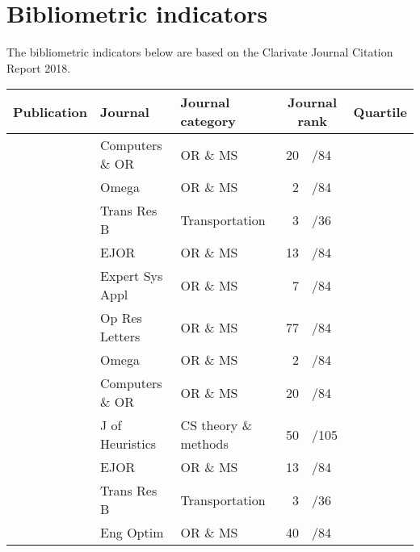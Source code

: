 \section*{Bibliometric indicators}

The bibliometric indicators below are based on the Clarivate Journal Citation Report 2018.

\begin{center}\footnotesize
    \begin{tabular}{p{7cm} p{2.5cm} p{2.5cm} r @{} l c}
        \toprule
        {\bf Publication} & {\bf Journal} & {\bf Journal category} & \multicolumn{2}{c}{\bf Journal rank} & {\bf Quartile} \\
        \midrule
        \textcite{blum2021commonss}       & Computers \& OR & OR \& MS             & 20 & /84  & \cellcolor{Q1}\textcolor{white}{\bf Q1} \\
        \textcite{santini2020covid}       & Omega           & OR \& MS             &  2 & /84  & \cellcolor{Q1}\textcolor{white}{\bf Q1} \\
        \textcite{santini2020crowd}       & Trans Res B     & Transportation       &  3 & /36  & \cellcolor{Q1}\textcolor{white}{\bf Q1} \\
        \textcite{santini2020vf}          & EJOR            & OR \& MS             & 13 & /84  & \cellcolor{Q1}\textcolor{white}{\bf Q1} \\
        \textcite{santini2019op}          & Expert Sys Appl & OR \& MS             &  7 & /84  & \cellcolor{Q1}\textcolor{white}{\bf Q1} \\
        \textcite{cornaz2019selective}    & Op Res Letters  & OR \& MS             & 77 & /84  & \cellcolor{Q4}\textcolor{white}{\bf Q4} \\
        \textcite{malaguti2018travelling} & Omega           & OR \& MS             &  2 & /84  & \cellcolor{Q1}\textcolor{white}{\bf Q1} \\
        \textcite{furini2018branch}       & Computers \& OR & OR \& MS             & 20 & /84  & \cellcolor{Q1}\textcolor{white}{\bf Q1} \\
        \textcite{santini2018measuring}   & J of Heuristics & CS theory \& methods & 50 & /105 & \cellcolor{Q2}\textcolor{white}{\bf Q2} \\
        \textcite{santini2017feeder}      & EJOR            & OR \& MS             & 13 & /84  & \cellcolor{Q1}\textcolor{white}{\bf Q1} \\
        \textcite{bettinelli2017realtime} & Trans Res B     & Transportation       &  3 & /36  & \cellcolor{Q1}\textcolor{white}{\bf Q1} \\
        \textcite{santini2015note}        & Eng Optim       & OR \& MS             & 40 & /84  & \cellcolor{Q2}\textcolor{white}{\bf Q2} \\
        \bottomrule    
    \end{tabular}
\end{center}